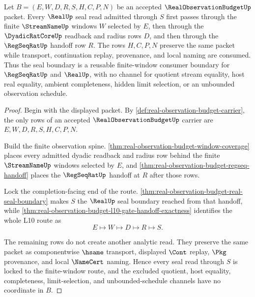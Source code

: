 \begin{theorem}
\label{thm:real-observation-budget-finite-window-seal-lock}
Let $B=(E,W,D,R,S,H,C,P,N)$ be an accepted $\RealObservationBudgetUp$ packet. Every $\RealUp$ seal read admitted through $S$ first passes through the finite $\StreamNameUp$ windows $W$ selected by $E$, then through the $\DyadicRatCoreUp$ readback and radius rows $D$, and then through the $\RegSeqRatUp$ handoff row $R$. The rows $H,C,P,N$ preserve the same packet while transport, continuation replay, provenance, and local naming are consumed. Thus the seal boundary is a reusable finite-window consumer boundary for $\RegSeqRatUp$ and $\RealUp$, with no channel for quotient stream equality, host real equality, ambient completeness, hidden limit selection, or an unbounded observation schedule.
\end{theorem}
\begin{proof}
Begin with the displayed packet. By \autoref{def:real-observation-budget-carrier}, the only rows of an accepted $\RealObservationBudgetUp$ carrier are $E,W,D,R,S,H,C,P,N$.

Build the finite observation spine. \autoref{thm:real-observation-budget-window-coverage} places every admitted dyadic readback and radius row behind the finite $\StreamNameUp$ windows selected by $E$, and \autoref{thm:real-observation-budget-regseq-handoff} places the $\RegSeqRatUp$ handoff at $R$ after those rows.

Lock the completion-facing end of the route. \autoref{thm:real-observation-budget-real-seal-boundary} makes $S$ the $\RealUp$ seal boundary reached from that handoff, while \autoref{thm:real-observation-budget-l10-gate-handoff-exactness} identifies the whole L10 route as
$$
E \longmapsto W \longmapsto D \longmapsto R \longmapsto S.
$$

The remaining rows do not create another analytic read. They preserve the same packet as componentwise $\hsame$ transport, displayed $\Cont$ replay, $\Pkg$ provenance, and local $\NameCert$ naming. Hence every seal read through $S$ is locked to the finite-window route, and the excluded quotient, host equality, completeness, limit-selection, and unbounded-schedule channels have no coordinate in $B$.
\end{proof}

